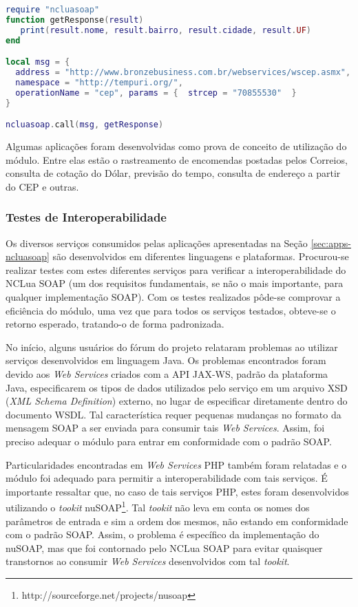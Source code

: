 \begin{lstlisting}[caption=Exemplo de consumo de WS de consulta de endereço a partir do CEP, label=list:ncluasoap2, language=lua]
require "ncluasoap"
function getResponse(result)
   print(result.nome, result.bairro, result.cidade, result.UF)
end

local msg = {
  address = "http://www.bronzebusiness.com.br/webservices/wscep.asmx",
  namespace = "http://tempuri.org/",
  operationName = "cep", params = {  strcep = "70855530"  }  
}

ncluasoap.call(msg, getResponse)
\end{lstlisting}

Algumas aplicações foram desenvolvidas como prova de conceito de utilização do módulo.
Entre elas estão o rastreamento de encomendas postadas pelos Correios,
consulta de cotação do Dólar, previsão do tempo,
consulta de endereço a partir do CEP e outras.

\subsubsection{Testes de Interoperabilidade}

Os diversos serviços consumidos pelas aplicações apresentadas na Seção \ref{sec:apps-ncluasoap} 
são desenvolvidos em diferentes linguagens e plataformas. Procurou-se realizar testes
com estes diferentes serviços para verificar a interoperabilidade do NCLua SOAP 
(um dos requisitos fundamentais, se não o mais importante, para qualquer implementação
SOAP). Com os testes realizados pôde-se comprovar a eficiência do módulo, uma vez que para todos
os serviços testados, obteve-se o retorno esperado, tratando-o de forma padronizada.

No início, alguns usuários do fórum do projeto relataram problemas ao utilizar serviços
desenvolvidos em linguagem Java. Os problemas encontrados foram
devido aos \textit{Web Services} criados com a API JAX-WS, padrão da plataforma Java,
especificarem os tipos de dados utilizados pelo serviço em um arquivo XSD (\textit{XML Schema Definition}) externo,
no lugar de especificar diretamente dentro do documento WSDL. 
Tal característica requer pequenas mudanças no formato da mensagem SOAP
a ser enviada para consumir tais \textit{Web Services}. Assim, foi
preciso adequar o módulo para entrar em conformidade com o padrão SOAP.

Particularidades encontradas em \textit{Web Services} PHP também foram relatadas
e o módulo foi adequado para permitir a interoperabilidade com tais serviços.
É importante ressaltar que, no caso de tais serviços PHP, estes foram desenvolvidos
utilizando o \textit{tookit} nuSOAP\footnote{http://sourceforge.net/projects/nusoap}.
Tal \textit{tookit} não leva em conta os nomes dos parâmetros de entrada e sim a ordem
dos mesmos, não estando em conformidade com o padrão SOAP. Assim, o problema é específico da implementação
do nuSOAP, mas que foi contornado pelo NCLua SOAP para evitar quaisquer transtornos
ao consumir \textit{Web Services} desenvolvidos com tal \textit{tookit}. 

